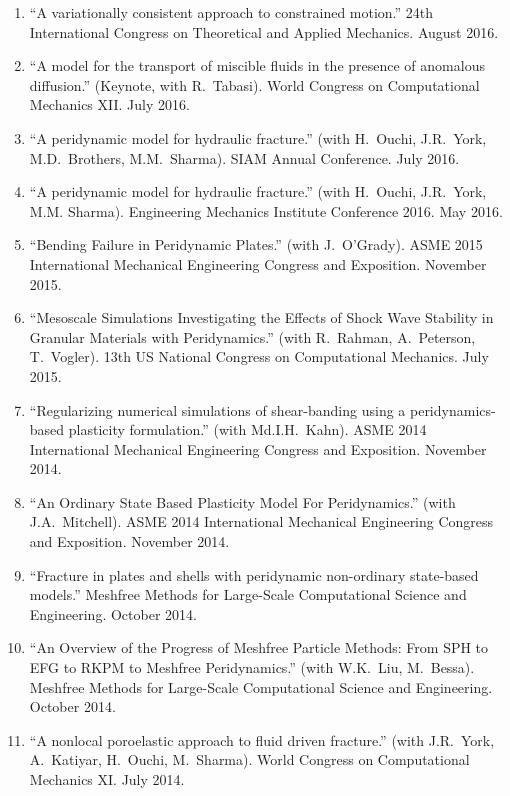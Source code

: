 \begin{etaremune}
\else
\begin{enumerate}
\fi
    \item ``A variationally consistent approach to constrained motion.'' 24th International Congress on Theoretical and Applied Mechanics.  August 2016.
    \item ``A model for the transport of miscible fluids in the presence of anomalous diffusion.'' (Keynote, with R.\ Tabasi). World Congress on Computational Mechanics XII.  July 2016.
    \item ``A peridynamic model for hydraulic fracture.'' (with H.\ Ouchi, J.R.\ York, M.D.\ Brothers, M.M.\ Sharma). SIAM Annual Conference.  July 2016.
    \item ``A peridynamic model for hydraulic fracture.'' (with H.\ Ouchi, J.R.\ York, M.M. Sharma). Engineering Mechanics Institute Conference 2016. May 2016.
    \item ``Bending Failure in Peridynamic Plates.'' (with J.~O'Grady). ASME 2015 International Mechanical Engineering Congress and Exposition. November 2015.
    \item ``Mesoscale Simulations Investigating the Effects of Shock Wave Stability in Granular Materials with Peridynamics.'' (with R.~Rahman, A.~Peterson, T.~Vogler). 13th US National Congress on Computational Mechanics. July 2015.
    \item ``Regularizing numerical simulations of shear-banding using a peridynamics-based plasticity formulation.'' (with Md.I.H.~Kahn). ASME 2014 International Mechanical Engineering Congress and Exposition. November 2014.
    \item ``An Ordinary State Based Plasticity Model For Peridynamics.'' (with J.A.~Mitchell). ASME 2014 International Mechanical Engineering Congress and Exposition. November 2014.
    \item ``Fracture in plates and shells with peridynamic non-ordinary state-based models.''  Meshfree Methods for Large-Scale Computational Science and Engineering. October 2014.
    \item ``An Overview of the Progress of Meshfree Particle Methods: From SPH to EFG to RKPM to Meshfree Peridynamics.'' (with W.K.~Liu, M.~Bessa). Meshfree Methods for Large-Scale Computational Science and Engineering. October 2014.
    \item ``A nonlocal poroelastic approach to fluid driven fracture.'' (with J.R.~York, A.~Katiyar, H.~Ouchi, M.~Sharma). World Congress on Computational Mechanics XI.  July 2014.

\end{enumerate}
\end{etaremune}
